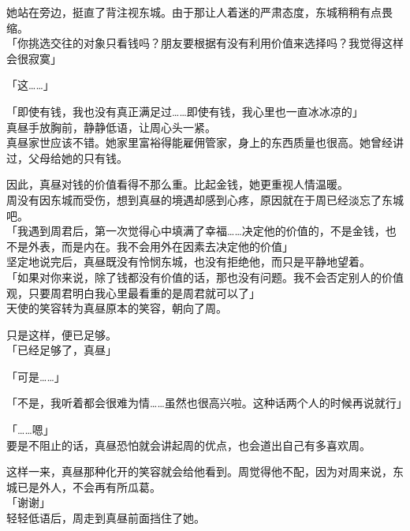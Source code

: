 她站在旁边，挺直了背注视东城。由于那让人着迷的严肃态度，东城稍稍有点畏缩。\\

「你挑选交往的对象只看钱吗？朋友要根据有没有利用价值来选择吗？我觉得这样会很寂寞」

「这……」

「即使有钱，我也没有真正满足过……即使有钱，我心里也一直冰冰凉的」\\

真昼手放胸前，静静低语，让周心头一紧。\\

真昼家世应该不错。她家里富裕得能雇佣管家，身上的东西质量也很高。她曾经讲过，父母给她的只有钱。

因此，真昼对钱的价值看得不那么重。比起金钱，她更重视人情温暖。\\

周没有因东城而受伤，想到真昼的境遇却感到心疼，原因就在于周已经淡忘了东城吧。\\

「我遇到周君后，第一次觉得心中填满了幸福……决定他的价值的，不是金钱，也不是外表，而是内在。我不会用外在因素去决定他的价值」\\

坚定地说完后，真昼既没有怜悯东城，也没有拒绝他，而只是平静地望着。\\

「如果对你来说，除了钱都没有价值的话，那也没有问题。我不会否定别人的价值观，只要周君明白我心里最看重的是周君就可以了」\\

天使的笑容转为真昼原本的笑容，朝向了周。

只是这样，便已足够。\\

「已经足够了，真昼」

「可是……」

「不是，我听着都会很难为情……虽然也很高兴啦。这种话两个人的时候再说就行」

「……嗯」\\

要是不阻止的话，真昼恐怕就会讲起周的优点，也会道出自己有多喜欢周。

这样一来，真昼那种化开的笑容就会给他看到。周觉得他不配，因为对周来说，东城已是外人，不会再有所瓜葛。\\

「谢谢」\\

轻轻低语后，周走到真昼前面挡住了她。\\

